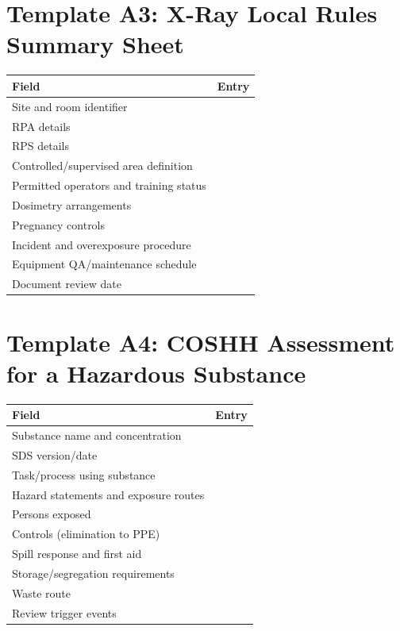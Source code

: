 \section{Template A3: X-Ray Local Rules Summary Sheet}
\begin{tabularx}{\textwidth}{>{\raggedright\arraybackslash}p{4.3cm}X}
\toprule
Field & Entry \\
\midrule
Site and room identifier & \\
RPA details & \\
RPS details & \\
Controlled/supervised area definition & \\
Permitted operators and training status & \\
Dosimetry arrangements & \\
Pregnancy controls & \\
Incident and overexposure procedure & \\
Equipment QA/maintenance schedule & \\
Document review date & \\
\bottomrule
\end{tabularx}

\section{Template A4: COSHH Assessment for a Hazardous Substance}
\begin{tabularx}{\textwidth}{>{\raggedright\arraybackslash}p{4.3cm}X}
\toprule
Field & Entry \\
\midrule
Substance name and concentration & \\
SDS version/date & \\
Task/process using substance & \\
Hazard statements and exposure routes & \\
Persons exposed & \\
Controls (elimination to PPE) & \\
Spill response and first aid & \\
Storage/segregation requirements & \\
Waste route & \\
Review trigger events & \\
\bottomrule
\end{tabularx}

